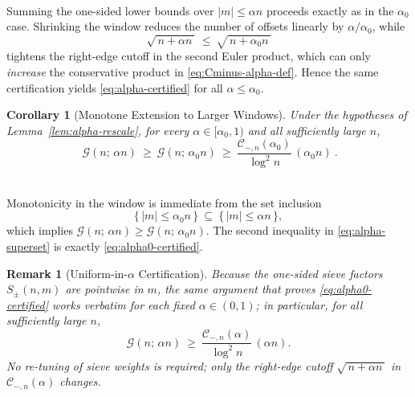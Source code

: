 \documentclass[11pt]{article}
\makeatletter
\theoremstyle{inline}
\newtheorem*{remark}{Remark}
\theoremstyle{break}
\renewenvironment{proof}[1][\proofname]{%
  \par\pushQED{\qed}%
  \normalfont \topsep6\p@\@plus6\p@\relax
  \trivlist
  \item[\hskip\labelsep
        \itshape
    #1\@addpunct{.}]\mbox{}\\  %
}{%
  \popQED\endtrivlist\@endpefalse
}
\theoremstyle{break}
\theoremstyle{break}
\theoremstyle{break}
\theoremstyle{break}
\theoremstyle{break}
\newtheorem{corollary}{Corollary}
\theoremstyle{break}
\theoremstyle{inline}
\newcommand{\CminusProductAlpha}[2]{\mathcal{C}_{-,#2}\!\left(#1\right)}
\makeatother
\begin{document}
\begin{proof}
Summing the one-sided lower bounds over \(|m|\le \alpha n\) proceeds exactly as in the \(\alpha_0\) case. Shrinking the window reduces the number of offsets linearly by \(\alpha/\alpha_0\), while
\begin{equation}\label{eq:right-edge-shift}
\sqrt{\,n+\alpha n\,}\ \le\ \sqrt{\,n+\alpha_0 n\,}
\end{equation}
tightens the right-edge cutoff in the second Euler product, which can only \emph{increase} the conservative product in \eqref{eq:Cminus-alpha-def}. Hence the same certification yields \eqref{eq:alpha-certified} for all \(\alpha\le\alpha_0\).
\end{proof}

\begin{corollary}[Monotone Extension to Larger Windows]
\label{cor:alpha-superset}
Under the hypotheses of Lemma~\ref{lem:alpha-rescale}, for every \(\alpha\in[\alpha_0,1)\) and all sufficiently large \(n\),
\begin{equation}\label{eq:alpha-superset}
\boxed{\ \ \mathcal G(n;\,\alpha n)\ \ge\ \mathcal G(n;\,\alpha_0 n)\ \ge\ \frac{\CminusProductAlpha{\alpha_0}{n}}{\log^2 n}\,(\alpha_0 n)\ .\ }
\end{equation}
\end{corollary}

\begin{proof}
Monotonicity in the window is immediate from the set inclusion
\begin{equation}\label{eq:window-inclusion}
\{\,|m|\le \alpha_0 n\,\}\ \subseteq\ \{\,|m|\le \alpha n\,\},
\end{equation}
which implies \(\mathcal G(n;\,\alpha n)\ge \mathcal G(n;\,\alpha_0 n)\). The second inequality in \eqref{eq:alpha-superset} is exactly \eqref{eq:alpha0-certified}.
\end{proof}

\begin{remark}[Uniform-in-\(\alpha\) Certification]
\label{rem:alpha-uniform}
Because the one-sided sieve factors \(S_\pm(n,m)\) are pointwise in \(m\), the same argument that proves \eqref{eq:alpha0-certified} works verbatim for each fixed \(\alpha\in(0,1)\); in particular, for all sufficiently large \(n\),
\begin{equation}\label{eq:alpha-uniform}
\mathcal G(n;\,\alpha n)\ \ge\ \frac{\CminusProductAlpha{\alpha}{n}}{\log^2 n}\,(\alpha n).
\end{equation}
No re-tuning of sieve weights is required; only the right-edge cutoff \(\sqrt{\,n+\alpha n\,}\) in \(\CminusProductAlpha{\alpha}{n}\) changes.
\end{remark}
\end{document}
